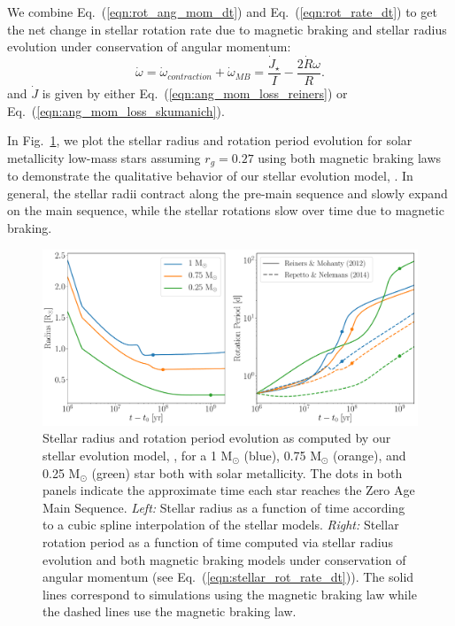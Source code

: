 We combine Eq.~(\ref{eqn:rot_ang_mom_dt}) and Eq.~(\ref{eqn:rot_rate_dt}) to get the net change in stellar rotation rate due to magnetic braking and stellar radius evolution under conservation of angular momentum:
\begin{equation} \label{eqn:stellar_rot_rate_dt}
\dot{\omega} = \dot{\omega}_{contraction} + \dot{\omega}_{MB} = \frac{\dot{J}_{\star}}{I} - \frac{2 \dot{R} \omega}{R}.
\end{equation}
and $\dot{J}$ is given by either Eq.~(\ref{eqn:ang_mom_loss_reiners}) or Eq.~(\ref{eqn:ang_mom_loss_skumanich}).

In Fig.~\ref{fig:stellar_example}, we plot the stellar radius and rotation period evolution for solar metallicity low-mass stars assuming $r_g = 0.27$ using both magnetic braking laws to demonstrate the qualitative behavior of our stellar evolution model, \stellar.  In general, the stellar radii contract along the pre-main sequence and slowly expand on the main sequence, while the stellar rotations slow over time due to magnetic braking.  


\begin{figure}[t]
	\includegraphics[width=\textwidth]{stellar_example.pdf}
    \caption{Stellar radius and rotation period evolution as computed by our stellar evolution model, \stellar, for a 1 M$_{\odot}$ (blue), 0.75 M$_{\odot}$ (orange), and 0.25 M$_{\odot}$ (green) star both with solar metallicity. The dots in both panels indicate the approximate time each star reaches the Zero Age Main Sequence.  {\it Left:} Stellar radius as a function of time according to a cubic spline interpolation of the \citet{Baraffe2015} stellar models.  {\it Right:} Stellar rotation period as a function of time computed via stellar radius evolution and both magnetic braking models under conservation of angular momentum (see Eq.~(\ref{eqn:stellar_rot_rate_dt})).  The solid lines correspond to simulations using the \citet{Reiners2012} magnetic braking law while the dashed lines use the \citet{Repetto2014} magnetic braking law.}
    \label{fig:stellar_example}
\end{figure}


